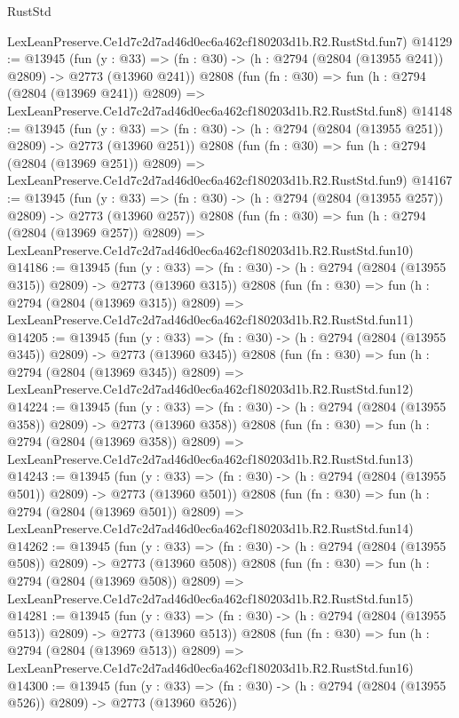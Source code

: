 \begin{lexlean}{RustStd}
\begin{coremodule}
    LexLeanPreserve.Ce1d7c2d7ad46d0ec6a462cf180203d1b.R2.RustStd.fun7)
@14129 := @13945
    (fun (y : @33) => (fn : @30) -> (h : @2794 (@2804 (@13955 @241)) @2809) -> @2773 (@13960 @241))
    @2808
    (fun (fn : @30) =>
    fun (h : @2794 (@2804 (@13969 @241)) @2809) =>
    LexLeanPreserve.Ce1d7c2d7ad46d0ec6a462cf180203d1b.R2.RustStd.fun8)
@14148 := @13945
    (fun (y : @33) => (fn : @30) -> (h : @2794 (@2804 (@13955 @251)) @2809) -> @2773 (@13960 @251))
    @2808
    (fun (fn : @30) =>
    fun (h : @2794 (@2804 (@13969 @251)) @2809) =>
    LexLeanPreserve.Ce1d7c2d7ad46d0ec6a462cf180203d1b.R2.RustStd.fun9)
@14167 := @13945
    (fun (y : @33) => (fn : @30) -> (h : @2794 (@2804 (@13955 @257)) @2809) -> @2773 (@13960 @257))
    @2808
    (fun (fn : @30) =>
    fun (h : @2794 (@2804 (@13969 @257)) @2809) =>
    LexLeanPreserve.Ce1d7c2d7ad46d0ec6a462cf180203d1b.R2.RustStd.fun10)
@14186 := @13945
    (fun (y : @33) => (fn : @30) -> (h : @2794 (@2804 (@13955 @315)) @2809) -> @2773 (@13960 @315))
    @2808
    (fun (fn : @30) =>
    fun (h : @2794 (@2804 (@13969 @315)) @2809) =>
    LexLeanPreserve.Ce1d7c2d7ad46d0ec6a462cf180203d1b.R2.RustStd.fun11)
@14205 := @13945
    (fun (y : @33) => (fn : @30) -> (h : @2794 (@2804 (@13955 @345)) @2809) -> @2773 (@13960 @345))
    @2808
    (fun (fn : @30) =>
    fun (h : @2794 (@2804 (@13969 @345)) @2809) =>
    LexLeanPreserve.Ce1d7c2d7ad46d0ec6a462cf180203d1b.R2.RustStd.fun12)
@14224 := @13945
    (fun (y : @33) => (fn : @30) -> (h : @2794 (@2804 (@13955 @358)) @2809) -> @2773 (@13960 @358))
    @2808
    (fun (fn : @30) =>
    fun (h : @2794 (@2804 (@13969 @358)) @2809) =>
    LexLeanPreserve.Ce1d7c2d7ad46d0ec6a462cf180203d1b.R2.RustStd.fun13)
@14243 := @13945
    (fun (y : @33) => (fn : @30) -> (h : @2794 (@2804 (@13955 @501)) @2809) -> @2773 (@13960 @501))
    @2808
    (fun (fn : @30) =>
    fun (h : @2794 (@2804 (@13969 @501)) @2809) =>
    LexLeanPreserve.Ce1d7c2d7ad46d0ec6a462cf180203d1b.R2.RustStd.fun14)
@14262 := @13945
    (fun (y : @33) => (fn : @30) -> (h : @2794 (@2804 (@13955 @508)) @2809) -> @2773 (@13960 @508))
    @2808
    (fun (fn : @30) =>
    fun (h : @2794 (@2804 (@13969 @508)) @2809) =>
    LexLeanPreserve.Ce1d7c2d7ad46d0ec6a462cf180203d1b.R2.RustStd.fun15)
@14281 := @13945
    (fun (y : @33) => (fn : @30) -> (h : @2794 (@2804 (@13955 @513)) @2809) -> @2773 (@13960 @513))
    @2808
    (fun (fn : @30) =>
    fun (h : @2794 (@2804 (@13969 @513)) @2809) =>
    LexLeanPreserve.Ce1d7c2d7ad46d0ec6a462cf180203d1b.R2.RustStd.fun16)
@14300 := @13945
    (fun (y : @33) => (fn : @30) -> (h : @2794 (@2804 (@13955 @526)) @2809) -> @2773 (@13960 @526))

\end{coremodule}
\end{lexlean}
